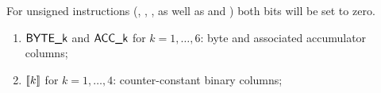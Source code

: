 \saNote{} For unsigned instructions (, , ,  as well as  and ) both bits will be set to zero.
\begin{enumerate}[resume]
    \item $\textsf{BYTE}\textsf{\_k}$ and $\textsf{ACC}\textsf{\_k}$ for $k = 1,\dots, 6$:
	byte and associated accumulator columns;
    \item $[\![k]\!]$ for $k = 1, \dots, 4$:
	counter-constant binary columns;
\end{enumerate}
